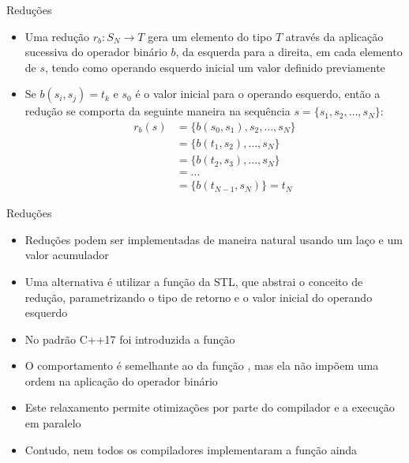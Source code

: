 \begin{frame}[fragile]{Reduções}

    \begin{itemize}
        \item Uma redução $r_b : S_N \to T$ gera um elemento do tipo $T$ através da aplicação 
            sucessiva do operador binário $b$, da esquerda para a direita, em cada elemento de $s$, 
            tendo como operando esquerdo inicial um valor definido previamente

        \item Se $b(s_i, s_j) = t_k$ e $s_0$ é o valor inicial para o operando esquerdo, 
            então a redução se comporta da seguinte maneira na sequência $s = \lbrace s_1, s_2,
                \ldots, s_N\rbrace$:
        \begin{align*}
            r_b(s) &= \lbrace b(s_0, s_1), s_2, \ldots, s_N\rbrace \\ 
            &= \lbrace b(t_1, s_2), \ldots, s_N\rbrace \\
            &= \lbrace b(t_2, s_3), \ldots, s_N\rbrace \\
            &= \ldots \\
            &= \lbrace b(t_{N-1}, s_N) \rbrace = t_N
        \end{align*}

    \end{itemize}

\end{frame}

\begin{frame}[fragile]{Reduções}

    \begin{itemize}
        \item Reduções podem ser implementadas de maneira natural usando um laço e um valor
            acumulador

        \item Uma alternativa é utilizar a função  da STL, que
            abstrai o conceito de redução, parametrizando o tipo de retorno e o valor
            inicial do operando esquerdo

        \item No padrão C++17 foi introduzida a função 

        \item O comportamento é semelhante ao da função , mas ela
            não impõem uma ordem na aplicação do operador binário

        \item Este relaxamento permite otimizações por parte do compilador e a execução
            em paralelo

        \item Contudo, nem todos os compiladores implementaram a função 
            ainda
    \end{itemize}

\end{frame}

